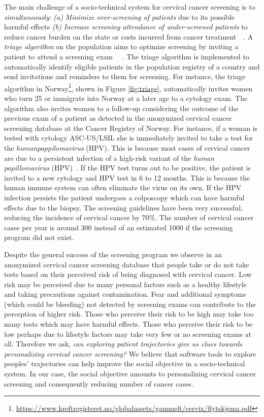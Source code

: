 \documentclass[10pt, conference]{IEEEtran}
\begin{document}
The main challenge of a socio-technical system for cervical cancer screening is to \emph{simultaneously}: 
\textit{(a)} \emph{Minimize over-screening of patients} due to its possible harmful effects \cite{bernie1998systematic} \cite{nobbenhuis1999relation} 
\textit{(b)} \emph{Increase screening attendance of under-screened patients} to reduce cancer burden on the state or costs incurred from cancer treatment~\cite{CostEffectivenessColorectalCancer}~\cite{CostEffectivenessCervicalCancer}.
A \emph{triage algorithm} on the population aims to optimize screening by inviting a patient to attend a screening exam ~\cite{CancerScreeningUS}~\cite{CervicalScreeningEU}. The triage algorithm  is implemented to automatically identify eligible patients in the population registry of a country and send invitations and reminders to them for screening. For instance, the triage algorithm in Norway\footnote{\url{https://www.kreftregisteret.no/globalassets/gammelt/cervix/flytskjema.pdf}}, shown in  Figure \ref{fig:triage}, automatically invites  women who turn 25 or immigrate into Norway at a later age to a cytology exam. The algorithm also invites women to a follow-up considering the outcome of the previous exam of a patient as detected in the anonymized cervical cancer screening database at the Cancer Registry of Norway. For instance, if a woman is tested with cytology ASC-US/LSIL she is immediately invited to take a test for the \emph{humanpappilomavirus} (HPV). This is because most cases of cervical cancer are due to a persistent infection of a high-risk variant of the \textit{human papillomavirus} (HPV)~\cite{HPVCC}. If the HPV test turns out to be positive, the patient is invited to a new cytology and HPV test in 6 to 12 months. This is because the human immune system can often eliminate the virus on its own. If the HPV infection persists the patient undergoes a colposcopy which can have harmful effects due to the biopsy. The screening guidelines have been very successful, reducing the incidence of cervical cancer by 70\%\cite{lonnberg2015cervical}.  The number of cervical cancer cases per year is around 300 instead of an estimated 1000 if the screening program did not exist.

Despite the general success of the screening program we observe in an anonymized cervical cancer screening database that people take or do not take tests based on their perceived risk of being diagnosed with cervical cancer. Low risk may be perceived due to many personal factors such as  a healthy lifestyle and  taking precautions against contamination. Fear and additional symptoms (which could be bleeding) not detected by screening exams can contribute to the perception of higher risk. Those who perceive their risk to be high may take too many tests which may have harmful effects. Those who perceive their risk to be low perhaps due to lifestyle factors may take very few or no screening exams at all. Therefore we ask, \emph{can exploring patient trajectories give us clues towards personalizing cervical cancer screening?} We believe that software tools to explore peoples' trajectories can help improve the social objective in a socio-technical system. In our case, the social objective amounts to personalizing cervical cancer screening and consequently reducing number of cancer cases.
\end{document}
